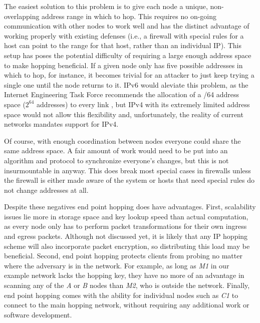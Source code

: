 \par The easiest solution to this problem is to give each node a unique, non-overlapping address range in which to hop. This requires no on-going communication with other nodes to work well and has the distinct advantage of working properly with existing defenses (i.e., a firewall with special rules for a host can point to the range for that host, rather than an individual IP). This setup has poses the potential difficulty of requiring a large enough address space to make hopping beneficial. If a given node only has five possible addresses in which to hop, for instance, it becomes trivial for an attacker to just keep trying a single one until the node returns to it. \ac{IPv6} would aleviate this problem, as the Internet Engineering Task Force recommends the allocation of a /64 address space ($2^{64}$ addresses) to every link \cite{rfc3267}, but \ac{IPv4} with its extremely limited address space would not allow this flexibility and, unfortunately, the reality of current networks mandates support for \ac{IPv4}. 

\par Of course, with enough coordination between nodes everyone could share the same address space. A fair amount of work would need to be put into an algorithm and protocol to synchronize everyone's changes, but this is not insurmountable in anyway. This does break most special cases in firewalls unless the firewall is either made aware of the system or hosts that need special rules do not change addresses at all.

\par Despite these negatives end point hopping does have advantages. First, scalability issues lie more in storage space and key lookup speed than actual computation, as every node only has to perform packet transformations for their own ingress and egress packets. Although not discussed yet, it is likely that any IP hopping scheme will also incorporate packet encryption, so distributing this load may be beneficial. Second, end point hopping protects clients from probing no matter where the adversary is in the network. For example, as long as \textit{M1} in our example network lacks the hopping key, they have no more of an advantage in scanning any of the \textit{A} or \textit{B} nodes than \textit{M2}, who is outside the network. Finally, end point hopping comes with the ability for individual nodes such as \textit{C1} to connect to the main hopping network, without requiring any additional work or software development.

